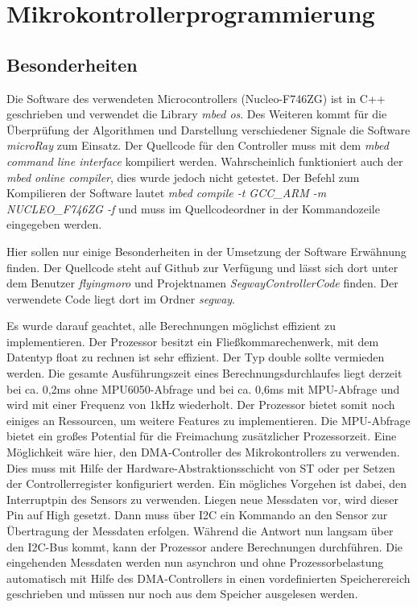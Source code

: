 \renewcommand{\autoren}{Stephan Morongowski}
\newpage
\section{Mikrokontrollerprogrammierung}
\subsection{Besonderheiten}
Die Software des verwendeten Microcontrollers (Nucleo-F746ZG) ist in C++ geschrieben und verwendet die Library \textit{mbed os}. Des Weiteren kommt für die Überprüfung der Algorithmen und Darstellung verschiedener Signale die Software \textit{microRay} zum Einsatz. Der Quellcode für den Controller muss mit dem \textit{mbed command line interface} kompiliert werden. Wahrscheinlich funktioniert auch der \textit{mbed online compiler}, dies wurde jedoch nicht getestet. Der Befehl zum Kompilieren der Software lautet \textit{mbed compile -t GCC\_ARM -m NUCLEO\_F746ZG -f} und muss im Quellcodeordner in der Kommandozeile eingegeben werden.

Hier sollen nur einige Besonderheiten in der Umsetzung der Software Erwähnung finden. Der Quellcode steht auf Github zur Verfügung und lässt sich dort unter dem Benutzer \textit{flyingmoro} und Projektnamen \textit{SegwayControllerCode} finden. Der verwendete Code liegt dort im Ordner \textit{segway}.

Es wurde darauf geachtet, alle Berechnungen möglichst effizient zu implementieren. Der Prozessor besitzt ein Fließkommarechenwerk, mit dem Datentyp float zu rechnen ist sehr effizient. Der Typ double sollte vermieden werden. Die gesamte Ausführungszeit eines Berechnungsdurchlaufes liegt derzeit bei ca. 0,2ms ohne MPU6050-Abfrage und bei ca. 0,6ms mit MPU-Abfrage und wird mit einer Frequenz von 1kHz wiederholt. Der Prozessor bietet somit noch einiges an Ressourcen, um weitere Features zu implementieren. Die MPU-Abfrage bietet ein großes Potential für die Freimachung zusätzlicher Prozessorzeit. Eine Möglichkeit wäre hier, den DMA-Controller des Mikrokontrollers zu verwenden. Dies muss mit Hilfe der Hardware-Abstraktionsschicht von ST oder per Setzen der Controllerregister konfiguriert werden. Ein mögliches Vorgehen ist dabei, den Interruptpin des Sensors zu verwenden. Liegen neue Messdaten vor, wird dieser Pin auf High gesetzt. Dann muss über I2C ein Kommando an den Sensor zur Übertragung der Messdaten erfolgen. Während die Antwort nun langsam über den I2C-Bus kommt, kann der Prozessor andere Berechnungen durchführen. Die eingehenden Messdaten werden nun asynchron und ohne Prozessorbelastung automatisch mit Hilfe des DMA-Controllers in einen vordefinierten Speicherereich geschrieben und müssen nur noch aus dem Speicher ausgelesen werden.




